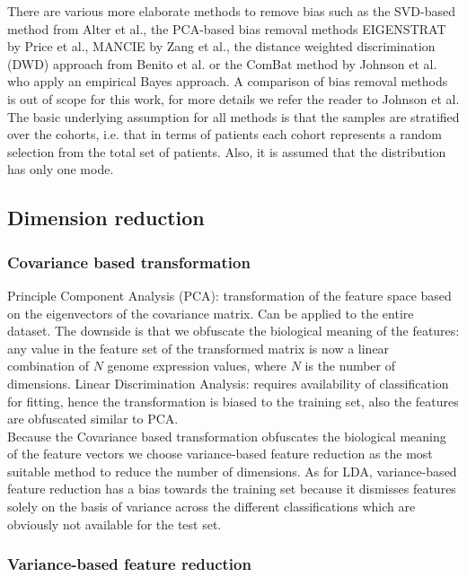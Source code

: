 \documentclass[a4paper,10pt]{article}
\begin{document}
%
There are various more elaborate methods to remove bias such as the SVD-based method from Alter et al.\cite{Alter2000}, the 
PCA-based bias removal methods EIGENSTRAT by Price et al.\cite{Price2006}, MANCIE by Zang et al.\cite{Zang2016}, the distance weighted discrimination (DWD)
approach from Benito et al.\cite{Benito2005} or the ComBat method by Johnson et al.\cite{Johnson2007} who apply an empirical Bayes approach. 
A comparison of bias removal methods is out of scope for this work, for more details we refer the reader to Johnson et al\cite{Johnson2007}.
The basic underlying assumption for all methods is that the samples are stratified over the cohorts, i.e. that in terms
of patients each cohort represents a random selection from the total set of patients. Also, it is assumed that 
the distribution has only one mode.

\subsection{Dimension reduction}
\subsubsection{Covariance based transformation}


Principle Component Analysis (PCA): transformation of the feature space based on the eigenvectors 
of the covariance matrix. Can be applied to the entire dataset.  The downside is that we obfuscate the 
biological meaning of the features: any value in the feature set of the transformed matrix is now a linear combination 
of $N$ genome expression values, where $N$ is the number of dimensions. 
Linear Discrimination Analysis: requires availability of classification for fitting, hence
the transformation is biased to the training set, also the features are obfuscated similar to PCA. \\
Because the Covariance based transformation obfuscates the biological meaning of the feature vectors 
we choose variance-based feature reduction as the most suitable method to reduce the number of dimensions.
As for LDA, variance-based feature reduction has a bias towards the training set because it dismisses features solely
on the basis of variance across the different classifications which are obviously not available for the test set.

\subsubsection{Variance-based feature reduction}
\end{document}
